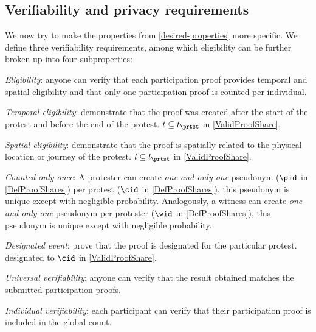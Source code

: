 \subsection{Verifiability and privacy requirements}%
\label{verifiability-properties}

We now try to make the properties from \cref{desired-properties} more 
specific.
We define three verifiability requirements, among which eligibility can be 
further broken up into four subproperties:
\begin{requirements}[V]
  \item\label{EligibilityVerif} \emph{Eligibility}: anyone can verify that each participation proof provides temporal and spatial eligibility and that only one participation proof is counted per individual.
    \begin{requirements}

    \item\label{TemporallyRelated} \emph{Temporal eligibility}: demonstrate that the proof was created after the start of the protest and before the end of the protest.
      \Ie \(t\subseteq t_{\prtst}\) in \cref{ValidProofShare}.

    \item\label{SpatiallyRelated} \emph{Spatial eligibility}: demonstrate that the proof is spatially related to the physical location or journey of the protest.
      \Ie \(l\subseteq l_{\prtst}\) in \cref{ValidProofShare}.

    \item\label{CountOnce} \emph{Counted only once}:
      A protester can create \emph{one and only one} pseudonym (\(\pid\) in 
      \cref{DefProofShares}) per protest (\(\cid\) in \cref{DefProofShares}), 
      this pseudonym is unique except with negligible probability.
      Analogously, a witness can create \emph{one and only one} pseudonym per 
      protester (\(\wid\) in \cref{DefProofShares}), this pseudonym is unique 
      except with negligible probability.

    \item\label{DesignatedEvent} \emph{Designated event}: prove that the proof 
      is designated for the particular protest.
      \Ie designated to \(\cid\) in \cref{ValidProofShare}.

    \end{requirements}

  \item\label{UniversalVerif} \emph{Universal verifiability}: anyone can verify that the result obtained matches the submitted participation proofs.

  \item\label{IndividualVerif} \emph{Individual verifiability}: each participant can verify that their participation proof is included in the global count.
\end{requirements}

